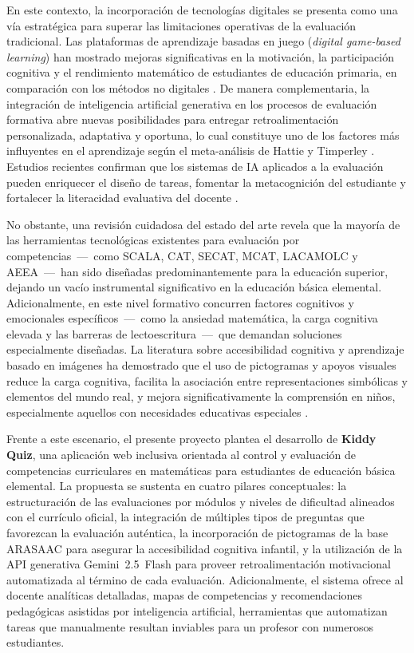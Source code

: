 En este contexto, la incorporación de tecnologías digitales se presenta como una vía estratégica para superar las limitaciones operativas de la evaluación tradicional. Las plataformas de aprendizaje basadas en juego (\textit{digital game-based learning}) han mostrado mejoras significativas en la motivación, la participación cognitiva y el rendimiento matemático de estudiantes de educación primaria, en comparación con los métodos no digitales \cite{debrenti2024gbl,sayed2023adaptive}. De manera complementaria, la integración de inteligencia artificial generativa en los procesos de evaluación formativa abre nuevas posibilidades para entregar retroalimentación personalizada, adaptativa y oportuna, lo cual constituye uno de los factores más influyentes en el aprendizaje según el meta-análisis de Hattie y Timperley \cite{hattie2007feedback}. Estudios recientes confirman que los sistemas de IA aplicados a la evaluación pueden enriquecer el diseño de tareas, fomentar la metacognición del estudiante y fortalecer la literacidad evaluativa del docente \cite{maksimchuk2025genai,gonzalez2021ai}.

No obstante, una revisión cuidadosa del estado del arte revela que la mayoría de las herramientas tecnológicas existentes para evaluación por competencias~---~como SCALA, CAT, SECAT, MCAT, LACAMOLC y AEEA~---~han sido diseñadas predominantemente para la educación superior, dejando un vacío instrumental significativo en la educación básica elemental. Adicionalmente, en este nivel formativo concurren factores cognitivos y emocionales específicos~---~como la ansiedad matemática, la carga cognitiva elevada y las barreras de lectoescritura~---~que demandan soluciones especialmente diseñadas. La literatura sobre accesibilidad cognitiva y aprendizaje basado en imágenes ha demostrado que el uso de pictogramas y apoyos visuales reduce la carga cognitiva, facilita la asociación entre representaciones simbólicas y elementos del mundo real, y mejora significativamente la comprensión en niños, especialmente aquellos con necesidades educativas especiales \cite{mayer2014multimedia,guillomia2021cognitive}.

Frente a este escenario, el presente proyecto plantea el desarrollo de \textbf{Kiddy Quiz}, una aplicación web inclusiva orientada al control y evaluación de competencias curriculares en matemáticas para estudiantes de educación básica elemental. La propuesta se sustenta en cuatro pilares conceptuales: la estructuración de las evaluaciones por módulos y niveles de dificultad alineados con el currículo oficial, la integración de múltiples tipos de preguntas que favorezcan la evaluación auténtica, la incorporación de pictogramas de la base ARASAAC para asegurar la accesibilidad cognitiva infantil, y la utilización de la API generativa Gemini~2.5~Flash para proveer retroalimentación motivacional automatizada al término de cada evaluación. Adicionalmente, el sistema ofrece al docente analíticas detalladas, mapas de competencias y recomendaciones pedagógicas asistidas por inteligencia artificial, herramientas que automatizan tareas que manualmente resultan inviables para un profesor con numerosos estudiantes.

